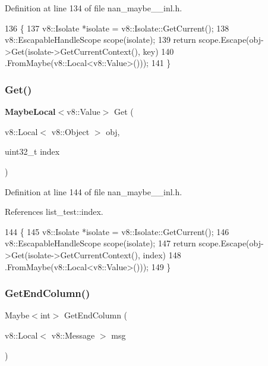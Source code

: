 Definition at line 134 of file nan\+\_\+maybe\+\_\+\_\+inl.\+h.


\begin{DoxyCode}
136                           \{
137   v8::Isolate *isolate = v8::Isolate::GetCurrent();
138   v8::EscapableHandleScope scope(isolate);
139   \textcolor{keywordflow}{return} scope.Escape(obj->Get(isolate->GetCurrentContext(), key)
140                           .FromMaybe(v8::Local<v8::Value>()));
141 \}
\end{DoxyCode}
\mbox{\label{nan__maybe__43__inl_8h_a5c96328fc00b58fc27ed881c1166164e}} 
\subsubsection{Get()\hspace{0.1cm}{\footnotesize\ttfamily [2/2]}}
{\footnotesize\ttfamily \textbf{ Maybe\+Local}$<$v8\+::\+Value$>$ Get (\begin{DoxyParamCaption}\item[{v8\+::\+Local$<$ v8\+::\+Object $>$}]{obj,  }\item[{uint32\+\_\+t}]{index }\end{DoxyParamCaption})}



Definition at line 144 of file nan\+\_\+maybe\+\_\+\_\+inl.\+h.



References list\+\_\+test\+::index.


\begin{DoxyCode}
144                                                                \{
145   v8::Isolate *isolate = v8::Isolate::GetCurrent();
146   v8::EscapableHandleScope scope(isolate);
147   \textcolor{keywordflow}{return} scope.Escape(obj->Get(isolate->GetCurrentContext(), index)
148                           .FromMaybe(v8::Local<v8::Value>()));
149 \}
\end{DoxyCode}
\mbox{\label{nan__maybe__43__inl_8h_a3a0c0b977b9cd543cdc895666bc07224}} 
\subsubsection{Get\+End\+Column()}
{\footnotesize\ttfamily Maybe$<$int$>$ Get\+End\+Column (\begin{DoxyParamCaption}\item[{v8\+::\+Local$<$ v8\+::\+Message $>$}]{msg }\end{DoxyParamCaption})}



